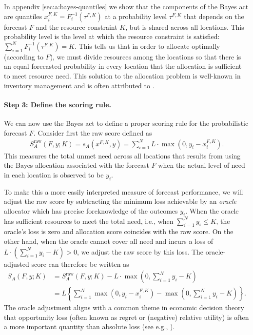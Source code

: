 \documentclass{article}\usepackage[]{graphicx}\usepackage[]{xcolor}
\providecommand{\DIFaddbegin}{} %
\providecommand{\DIFaddend}{} %
\newcommand{\DIFaddincludegraphics}[2][]{{\color{blue}\fbox{\DIFOincludegraphics[#1]{#2}}}} %
\DeclareRobustCommand{\DIFaddbegin}{\DIFOaddbegin \let\includegraphics\DIFaddincludegraphics} %
\DeclareRobustCommand{\DIFaddend}{\DIFOaddend \let\includegraphics\DIFOincludegraphics} %
\begin{document}
In appendix \ref{sec:a:bayes-quantiles} we show that the components of the Bayes act are quantiles 
$x_i^{F,K} = F_i^{-1}(\tau^{F,K})$ at a probability level $\tau^{F,K}$ that depends on the forecast $F$ and the resource
constraint $K$, but is shared across all locations. This probability level is the level at which the resource constraint
is satisfied: $\sum_{i=1}^N F_i^{-1}(\tau^{F,K}) = K$. This tells us that in order to allocate optimally (according to
$F$), we must divide resources among the locations so that there is an equal forecasted probability in every location
that the allocation is sufficient to meet resource need. This solution to the allocation problem is well-known in
inventory management and is often attributed to \cite{hadleywhitin1963}.

\paragraph{Step 3: Define the scoring rule.} We can now use the Bayes act to define a proper scoring rule for the
probabilistic forecast $F$. Consider first the raw score defined as
\begin{align}
  S_A^{\text{raw}}(F, y; K) = s_A(x^{F,K}, y) = \sum_{i=1}^N L \cdot \max(0, y_i - x_i^{F,K}). \DIFaddbegin \label{eqn:AS-raw}
\DIFaddend \end{align}
This measures the total unmet need across all locations that results from using the Bayes allocation associated with the
forecast $F$ when the actual level of need in each location is observed to be $y_i$.

To make this a more easily interpreted measure of forecast performance, we will adjust the raw score by subtracting the
minimum loss achievable by an \emph{oracle} allocator which has precise foreknowledge of the outcomes $y_i$. When the
oracle has sufficient resources to meet the total need, i.e., when $\sum_{i=1}^{N}y_i \leq K$, the oracle's loss is zero
and allocation score coincides with the raw score. On the other hand, when the oracle cannot cover all need and incurs a
loss of $L \cdot \left(\sum_{i=1}^{N}y_i - K \right) > 0$, we adjust the raw score by this loss.
The oracle-adjusted score can therefore be written as
\begin{align}
  S_A(F, y; K)  &= S_A^{\text{raw}}(F, y; K) - L \cdot \max\left(0,\sum_{i=1}^{N}y_i - K\right) \\
  &= L\left\{\sum_{i=1}^N \max(0, y_i - x_i^{F,K}) -  \max\left(0,\sum_{i=1}^{N}y_i - K\right)\right\}. \DIFaddbegin \label{eqn:AS-orc}
\DIFaddend \end{align}
The oracle adjustment aligns with a common theme in economic decision theory that opportunity loss (often known
as regret or (negative) relative utility) is often a more important quantity than absolute loss (see e.g.,
\cite{DIECIDUE201788}).
\end{document}
